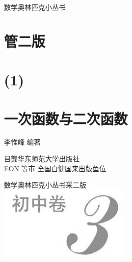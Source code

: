 \documentclass[10pt]{article}
\begin{document}
数学奥林匹克小丛书

\section*{管二版}
\section*{(1)}
\section*{一次函数与二次函数}
李惟峰 编著

目龔华东师范大学出版社\\
EON 等市 全国白健国来出版鱼位

数学奥林匹克小丛书采二版\\
\includegraphics[max width=\textwidth, center]{2024_10_30_1bf34f7aeb61f11d11d3g-002}\\
\end{document}
